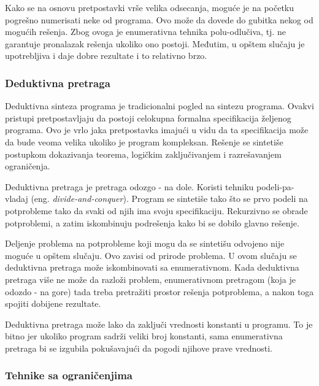 Kako se na osnovu pretpostavki vrše velika odsecanja, moguće je na početku pogrešno numerisati neke od programa. Ovo može da dovede do gubitka nekog od mogućih rešenja. Zbog ovoga je enumerativna tehnika polu-odlučiva, tj. ne garantuje pronalazak rešenja ukoliko ono postoji. Međutim, u opštem slučaju je upotrebljiva i daje dobre rezultate i to relativno brzo.


\subsubsection{Deduktivna pretraga}
\label{subsubsec:Deductive}

Deduktivna sinteza programa je tradicionalni pogled na sintezu programa. Ovakvi pristupi pretpostavljaju da postoji celokupna formalna specifikacija željenog programa. Ovo je vrlo jaka pretpostavka imajući u vidu da ta specifikacija može da bude veoma velika ukoliko je program kompleksan. Rešenje se sintetiše postupkom dokazivanja teorema, logičkim zaključivanjem i razrešavanjem ograničenja.

Deduktivna pretraga je pretraga odozgo - na dole. Koristi tehniku podeli-pa-vladaj (eng. \emph{divide-and-conquer}). Program se sintetiše tako što se prvo podeli na potprobleme tako da svaki od njih ima svoju specifikaciju. Rekurzivno se obrade potproblemi, a zatim iskombinuju podrešenja kako bi se dobilo glavno rešenje.

Deljenje problema na potprobleme koji mogu da se sintetišu odvojeno nije moguće u opštem slučaju. Ovo zavisi od prirode problema. U ovom slučaju se deduktivna pretraga može iskombinovati sa enumerativnom. Kada deduktivna pretraga više ne može da razloži problem, enumerativnom pretragom (koja je odozdo - na gore) tada treba pretražiti prostor rešenja potproblema, a nakon toga spojiti dobijene rezultate.

Deduktivna pretraga može lako da zaključi vrednosti konstanti u programu. To je bitno jer ukoliko program sadrži veliki broj konstanti, sama enumerativna pretraga bi se izgubila pokušavajući da pogodi njihove prave vrednosti.


\subsubsection{Tehnike sa ograničenjima}
\label{subsubsec:ConstraintSolving}

